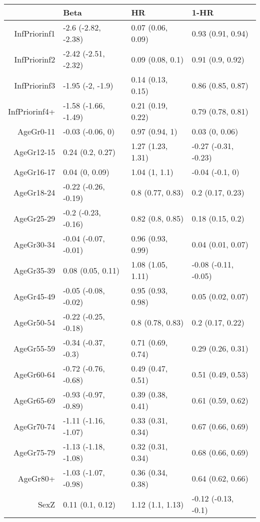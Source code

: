\begin{table}[ht]
\centering
\begin{tabular}{rlll}
  \hline
 & Beta & HR & 1-HR \\ 
  \hline
InfPriorinf1 & -2.6 (-2.82, -2.38) & 0.07 (0.06, 0.09) & 0.93 (0.91, 0.94) \\ 
  InfPriorinf2 & -2.42 (-2.51, -2.32) & 0.09 (0.08, 0.1) & 0.91 (0.9, 0.92) \\ 
  InfPriorinf3 & -1.95 (-2, -1.9) & 0.14 (0.13, 0.15) & 0.86 (0.85, 0.87) \\ 
  InfPriorinf4+ & -1.58 (-1.66, -1.49) & 0.21 (0.19, 0.22) & 0.79 (0.78, 0.81) \\ 
  AgeGr0-11 & -0.03 (-0.06, 0) & 0.97 (0.94, 1) & 0.03 (0, 0.06) \\ 
  AgeGr12-15 & 0.24 (0.2, 0.27) & 1.27 (1.23, 1.31) & -0.27 (-0.31, -0.23) \\ 
  AgeGr16-17 & 0.04 (0, 0.09) & 1.04 (1, 1.1) & -0.04 (-0.1, 0) \\ 
  AgeGr18-24 & -0.22 (-0.26, -0.19) & 0.8 (0.77, 0.83) & 0.2 (0.17, 0.23) \\ 
  AgeGr25-29 & -0.2 (-0.23, -0.16) & 0.82 (0.8, 0.85) & 0.18 (0.15, 0.2) \\ 
  AgeGr30-34 & -0.04 (-0.07, -0.01) & 0.96 (0.93, 0.99) & 0.04 (0.01, 0.07) \\ 
  AgeGr35-39 & 0.08 (0.05, 0.11) & 1.08 (1.05, 1.11) & -0.08 (-0.11, -0.05) \\ 
  AgeGr45-49 & -0.05 (-0.08, -0.02) & 0.95 (0.93, 0.98) & 0.05 (0.02, 0.07) \\ 
  AgeGr50-54 & -0.22 (-0.25, -0.18) & 0.8 (0.78, 0.83) & 0.2 (0.17, 0.22) \\ 
  AgeGr55-59 & -0.34 (-0.37, -0.3) & 0.71 (0.69, 0.74) & 0.29 (0.26, 0.31) \\ 
  AgeGr60-64 & -0.72 (-0.76, -0.68) & 0.49 (0.47, 0.51) & 0.51 (0.49, 0.53) \\ 
  AgeGr65-69 & -0.93 (-0.97, -0.89) & 0.39 (0.38, 0.41) & 0.61 (0.59, 0.62) \\ 
  AgeGr70-74 & -1.11 (-1.16, -1.07) & 0.33 (0.31, 0.34) & 0.67 (0.66, 0.69) \\ 
  AgeGr75-79 & -1.13 (-1.18, -1.08) & 0.32 (0.31, 0.34) & 0.68 (0.66, 0.69) \\ 
  AgeGr80+ & -1.03 (-1.07, -0.98) & 0.36 (0.34, 0.38) & 0.64 (0.62, 0.66) \\ 
  SexZ & 0.11 (0.1, 0.12) & 1.12 (1.1, 1.13) & -0.12 (-0.13, -0.1) \\ 
   \hline
\end{tabular}
\end{table}
